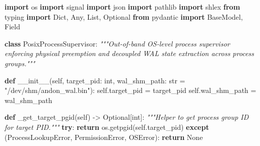 \documentclass[
  10pt,letterpaper]{article}
\newenvironment{Shaded}{}{}
\newcommand{\BuiltInTok}[1]{\textcolor[rgb]{0.00,0.50,0.00}{#1}}
\newcommand{\CommentTok}[1]{\textcolor[rgb]{0.38,0.63,0.69}{\textit{#1}}}
\newcommand{\ControlFlowTok}[1]{\textcolor[rgb]{0.00,0.44,0.13}{\textbf{#1}}}
\newcommand{\FunctionTok}[1]{\textcolor[rgb]{0.02,0.16,0.49}{#1}}
\newcommand{\ImportTok}[1]{\textcolor[rgb]{0.00,0.50,0.00}{\textbf{#1}}}
\newcommand{\KeywordTok}[1]{\textcolor[rgb]{0.00,0.44,0.13}{\textbf{#1}}}
\newcommand{\NormalTok}[1]{#1}
\newcommand{\OperatorTok}[1]{\textcolor[rgb]{0.40,0.40,0.40}{#1}}
\newcommand{\PreprocessorTok}[1]{\textcolor[rgb]{0.74,0.48,0.00}{#1}}
\newcommand{\StringTok}[1]{\textcolor[rgb]{0.25,0.44,0.63}{#1}}
\newcommand{\VariableTok}[1]{\textcolor[rgb]{0.10,0.09,0.49}{#1}}
\begin{document}
\begin{Shaded}
\begin{Highlighting}[]
\ImportTok{import}\NormalTok{ os}
\ImportTok{import}\NormalTok{ signal}
\ImportTok{import}\NormalTok{ json}
\ImportTok{import}\NormalTok{ pathlib}
\ImportTok{import}\NormalTok{ shlex}
\ImportTok{from}\NormalTok{ typing }\ImportTok{import}\NormalTok{ Dict, Any, List, Optional}
\ImportTok{from}\NormalTok{ pydantic }\ImportTok{import}\NormalTok{ BaseModel, Field}

\KeywordTok{class}\NormalTok{ PosixProcessSupervisor:}
    \CommentTok{"""Out{-}of{-}band OS{-}level process supervisor enforcing physical preemption}
\CommentTok{    and decoupled WAL state extraction across process groups."""}

    \KeywordTok{def} \FunctionTok{\_\_init\_\_}\NormalTok{(}\VariableTok{self}\NormalTok{, target\_pid: }\BuiltInTok{int}\NormalTok{, wal\_shm\_path: }\BuiltInTok{str} \OperatorTok{=} \StringTok{"/dev/shm/andon\_wal.bin"}\NormalTok{):}
        \VariableTok{self}\NormalTok{.target\_pid }\OperatorTok{=}\NormalTok{ target\_pid}
        \VariableTok{self}\NormalTok{.wal\_shm\_path }\OperatorTok{=}\NormalTok{ wal\_shm\_path}

    \KeywordTok{def}\NormalTok{ \_get\_target\_pgid(}\VariableTok{self}\NormalTok{) }\OperatorTok{{-}\textgreater{}}\NormalTok{ Optional[}\BuiltInTok{int}\NormalTok{]:}
        \CommentTok{"""Helper to get process group ID for target PID."""}
        \ControlFlowTok{try}\NormalTok{:}
            \ControlFlowTok{return}\NormalTok{ os.getpgid(}\VariableTok{self}\NormalTok{.target\_pid)}
        \ControlFlowTok{except}\NormalTok{ (}\PreprocessorTok{ProcessLookupError}\NormalTok{, }\PreprocessorTok{PermissionError}\NormalTok{, }\PreprocessorTok{OSError}\NormalTok{):}
            \ControlFlowTok{return} \VariableTok{None}


\end{Highlighting}
\end{Shaded}
\end{document}
